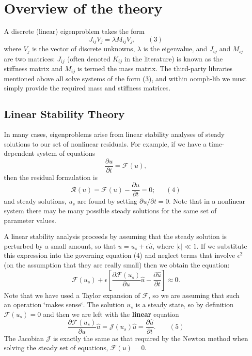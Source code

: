 \hypertarget{index_theory}{}\section{Overview of the theory}\label{index_theory}
A discrete (linear) eigenproblem takes the form \[ J_{ij} V_{j} = \lambda M_{ij} V_{j}, \ \ \ \ \ \ \ \ (3) \] where $ V_{j} $ is the vector of discrete unknowns, $ \lambda $ is the eigenvalue, and $ J_{ij} $ and $ M_{ij} $ are two matrices\+: $ J_{ij} $ (often denoted $ K_{ij} $ in the literature) is known as the stiffness matrix and $ M_{ij} $ is termed the mass matrix. The third-\/party libraries mentioned above all solve systems of the form (3), and within {\ttfamily oomph-\/lib} we must simply provide the required mass and stiffness matrices.\hypertarget{index_linear_stab}{}\subsection{Linear Stability Theory}\label{index_linear_stab}
In many cases, eigenproblems arise from linear stability analyses of steady solutions to our set of nonlinear residuals. For example, if we have a time-\/dependent system of equations \[ \frac{\partial u}{\partial t} = \mathcal{F}(u), \] then the residual formulation is \[ \mathcal{R}(u) = \mathcal{F}(u) - \frac{\partial u}{\partial t} = 0; \ \ \ \ \ \ \ (4) \] and steady solutions, $ u_{s} $ are found by setting $ \partial u / \partial t = 0 $. Note that in a nonlinear system there may be many possible steady solutions for the same set of parameter values.

A linear stability analysis proceeds by assuming that the steady solution is perturbed by a small amount, so that $ u = u_{s} + \epsilon \hat{u} $, where $ |\epsilon| \ll 1$. If we substitute this expression into the governing equation (4) and neglect terms that involve $ \epsilon^{2} $ (on the assumption that they are really small) then we obtain the equation\+: \[ \mathcal{F}(u_{s}) + \epsilon \left[\frac{\partial \mathcal{F}(u_{s})}{\partial u} \hat{u} - \frac{\partial \hat{u}}{\partial t} \right] \approx 0. \] Note that we have used a Taylor expansion of $ \mathcal{F} $, so we are assuming that such an operation \char`\"{}makes sense\char`\"{}. The solution $ u_{s} $ is a steady state, so by definition $\mathcal{F}(u_{s}) = 0$ and then we are left with the {\bfseries linear} equation \[ \frac{\partial \mathcal{F} (u_{s})}{\partial u} \hat{u} = \mathcal{J}(u_{s}) \hat{u} = \frac{\partial \hat{u}}{\partial t}. \ \ \ \ \ \ \ \ \ (5) \] The Jacobian $ \mathcal{J} $ is exactly the same as that required by the Newton method when solving the steady set of equations, $ \mathcal{F}(u) = 0.$

